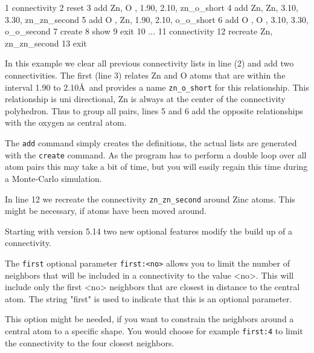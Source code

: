 \begin{MacVerbatim} 
  1   connectivity
  2      reset
  3      add  Zn, O , 1.90, 2.10, zn_o_short
  4      add  Zn, Zn, 3.10, 3.30, zn_zn_second
  5      add  O , Zn, 1.90, 2.10, o_o_short
  6      add  O , O , 3.10, 3.30, o_o_second
  7      create
  8      show
  9   exit
 10   ...
 11   connectivity
 12      recreate Zn, zn_zn_second
 13   exit
\end{MacVerbatim} 

In this example we clear all previous connectivity lists in line (2) and
add two connectivities. The first (line 3) relates Zn and O atoms that are within 
the interval 1.90 to 2.10\AA\  and provides a name {\tt zn\_o\_short} 
for this relationship. This relationship is uni directional, Zn is 
always at the center of the connectivity polyhedron. Thus to group 
all pairs, lines 5 and 6 add the opposite relationships with the oxygen 
as central atom.

The {\tt add} command simply creates the definitions, the actual 
lists are generated with the {\tt create} command. As the program 
has to perform a double loop over all atom pairs this may take a bit 
of time, but you will easily regain this time during a Monte-Carlo 
simulation.

In line 12 we recreate the connectivity {\tt zn\_zn\_second} around
Zinc atoms. This might be necessary, if atoms have been moved around.

Starting with version 5.14 two new optional features modify the 
build up of a connectivity.

The {\tt first} optional parameter {\tt first:<no>} allows you to limit
the number of neighbors that will be included in a connectivity to
the value <no>. This will include only the first <no> neighbors
that are closest in distance to the central atom. 
The string "first" is used to indicate that this 
is an optional parameter. 

This option might be needed, if you want to constrain the neighbors
around a central atom to a specific shape. You would choose for 
example {\tt first:4} to limit the connectivity to the four closest 
neighbors.

